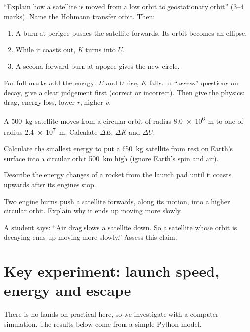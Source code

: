 \begin{examtip}
``Explain how a satellite is moved from a low orbit to geostationary orbit''
(3--4 marks). Name the Hohmann transfer orbit. Then:
\begin{enumerate}
  \item A burn at perigee pushes the satellite forwards. Its orbit becomes an ellipse.
  \item While it coasts out, $K$ turns into $U$.
  \item A second forward burn at apogee gives the new circle.
\end{enumerate}
For full marks add the energy: $E$ and $U$ rise, $K$ falls. In ``assess''
questions on decay, give a clear judgement first (correct or incorrect). Then
give the physics: drag, energy loss, lower $r$, higher $v$.
\end{examtip}

\begin{quickcheck}
  \item A \qty{500}{kg} satellite moves from a circular orbit of radius
        \qty{8.0e6}{m} to one of radius \qty{2.4e7}{m}. Calculate $\Delta E$,
        $\Delta K$ and $\Delta U$.
  \item\label{ch5:qc:launch} Calculate the smallest energy to put a
        \qty{650}{kg} satellite from rest on Earth's surface into a circular
        orbit \qty{500}{km} high (ignore Earth's spin and air).
  \item Describe the energy changes of a rocket from the launch pad until it
        coasts upwards after its engines stop.\label{ch5:qc:launchenergy}
  \item Two engine burns push a satellite forwards, along its motion, into a
        higher circular orbit. Explain why it ends up moving more slowly.
  \item A student says: ``Air drag slows a satellite down. So a satellite whose
        orbit is decaying ends up moving more slowly.'' Assess this
        claim.\label{ch5:qc:assess}
\end{quickcheck}

\section{Key experiment: launch speed, energy and escape}\label{ch5:sec:experiment}

There is no hands-on practical here, so we investigate with a computer
simulation. The results below come from a simple Python model.

